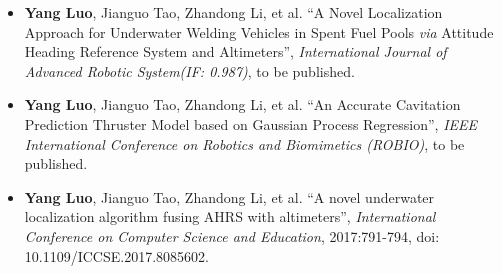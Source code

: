 %
%



\begin{itemize}
	\item \textbf{Yang Luo}, Jianguo Tao, Zhandong Li, et al. ``A Novel Localization Approach for Underwater Welding	Vehicles in Spent Fuel Pools \textit{via} Attitude Heading Reference System and Altimeters'', \emph{International Journal of Advanced Robotic System(IF: 0.987)}, to be published. \\
	{ \footnotesize {}}
	\item \textbf{Yang Luo}, Jianguo Tao, Zhandong Li, et al. ``An Accurate Cavitation Prediction Thruster Model based on Gaussian Process Regression'', \emph{IEEE International Conference on Robotics and Biomimetics (ROBIO)}, to be published.\\
	{ \footnotesize {}}
	\item \textbf{Yang Luo}, Jianguo Tao, Zhandong Li, et al. ``A novel underwater localization algorithm fusing AHRS with altimeters'', \emph{International Conference on Computer Science and Education}, 2017:791-794, doi: 10.1109/ICCSE.2017.8085602.\\	
	{ \footnotesize {}}
\end{itemize}